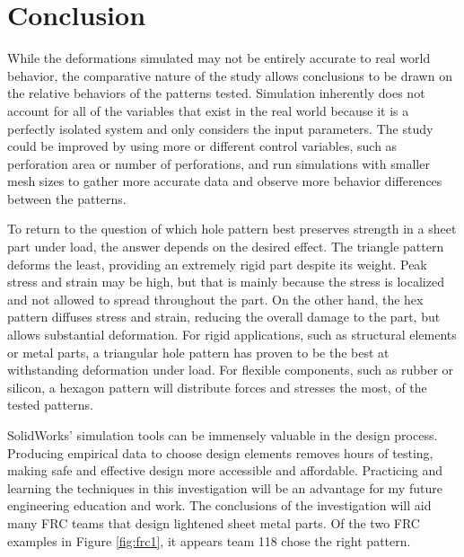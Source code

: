 \documentclass[12pt, letterpaper]{article}
\begin{document}
\section{Conclusion}
\label{sec:conclusion}

While the deformations simulated may not be entirely accurate to real world behavior, the comparative nature of the study allows conclusions to be drawn on the relative behaviors of the patterns tested. Simulation inherently does not account for all of the variables that exist in the real world because it is a perfectly isolated system and only considers the input parameters. The study could be improved by using more or different control variables, such as perforation area or number of perforations, and run simulations with smaller mesh sizes to gather more accurate data and observe more behavior differences between the patterns. 

To return to the question of which hole pattern best preserves strength in a sheet part under load, the answer depends on the desired effect. The triangle pattern deforms the least, providing an extremely rigid part despite its weight. Peak stress and strain may be high, but that is mainly because the stress is localized and not allowed to spread throughout the part. On the other hand, the hex pattern diffuses stress and strain, reducing the overall damage to the part, but allows substantial deformation. For rigid applications, such as structural elements or metal parts, a triangular hole pattern has proven to be the best at withstanding deformation under load. For flexible components, such as rubber or silicon, a hexagon pattern will distribute forces and stresses the most, of the tested patterns. 

SolidWorks' simulation tools can be immensely valuable in the design process. Producing empirical data to choose design elements removes hours of testing, making safe and effective design more accessible and affordable. Practicing and learning the techniques in this investigation will be an advantage for my future engineering education and work. The conclusions of the investigation will aid many FRC teams that design lightened sheet metal parts. Of the two FRC examples in Figure \ref{fig:frc1}, it appears team 118 chose the right pattern. 

\newpage
\printbibliography{}

\newpage
\appendix
{}
\appendixpage
\addappheadtotoc
\listoffigures
\end{document}
